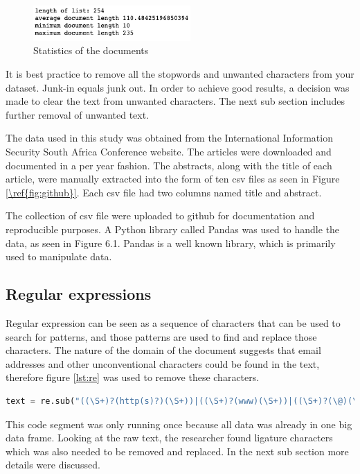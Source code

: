 \begin{figure}[h!]
\centering
\includegraphics[width=6cm]{./figures/docstats.png}
\caption{Statistics of the documents}
\label{fig:data}
\end{figure}
It is best practice to remove all the stopwords and unwanted characters from your dataset. Junk-in equals junk out. In order to achieve good results, a decision was made to clear the text from unwanted characters. The next sub section includes further removal of unwanted text.



The data used in this study was obtained from the International Information Security South Africa Conference website. The articles were downloaded and documented in a per year fashion. The abstracts, along with the title of each article, were manually extracted into the form of ten csv files as seen in Figure \ref{\ref{fig:github}}. Each csv file had two columns named title and abstract. 


The collection of csv file were uploaded to github for documentation and reproducible purposes. A Python library called Pandas was used to handle the data, as seen in Figure 6.1. Pandas is a well known library, which is primarily used to manipulate data.





\subsection{Regular expressions}
Regular expression can be seen as a sequence of characters that can be used to search for patterns, and those patterns are used to find and replace those characters. The nature of the domain of the document suggests that email addresses and other unconventional characters could be found in the text, therefore figure \ref{lst:re} was used to remove these characters.
\begin{lstlisting}[language=Python, label={lst:re}, caption=Regular Expression]
text = re.sub("((\S+)?(http(s)?)(\S+))|((\S+)?(www)(\S+))|((\S+)?(\@)(\S+)?)", " ", text)
\end{lstlisting}
This code segment was only running once because all data was already in one big data frame. Looking at the raw text, the researcher found ligature characters which was also needed to be removed and replaced. In the next sub section more details were discussed.

